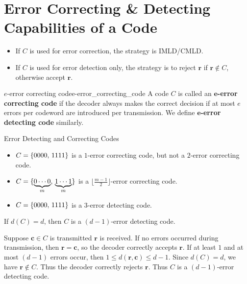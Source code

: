 
\section{Error Correcting \& Detecting Capabilities of a Code}
\begin{itemize}
    \item If $ C $ is used for error correction, the strategy is IMLD/CMLD\@.
    \item If $ C $ is used for error detection only, the strategy is
          to reject $ \symbf{r} $ if $ \symbf{r}\notin C $, otherwise accept $ \symbf{r} $.
\end{itemize}

\begin{Definition}{$ e $-error correcting code}{e-error_correcting_code}
    A code $ C $ is called an \textbf{$\symbf{e}$-error correcting code}
    if the decoder always makes the correct decision if
    at most $ e $ errors per codeword are introduced per transmission.
    We define \textbf{$\symbf{e}$-error detecting code} similarly.
\end{Definition}

\begin{Example}{Error Detecting and Correcting Codes}{}
    \begin{itemize}
        \item $ C=\{0000,\,1111\} $ is a $ 1 $-error correcting code, but not a
              $ 2 $-error correcting code.
        \item $ C=\{\underbrace{0\cdots 0}_{m},\,\underbrace{1\cdots 1}_{m}\} $
              is a $ \bigl\lfloor \frac{m-1}{2} \bigr\rfloor $-error correcting code.
        \item $ C=\{0000,\,1111\} $ is a $ 3 $-error detecting code.
    \end{itemize}
\end{Example}

\begin{Theorem}{}{}
    If $ d(C)=d $, then $ C $ is a $ (d-1) $-error detecting code.
\end{Theorem}

\begin{Proof}{}{}
    Suppose $ \symbf{c}\in C $ is transmitted $ \symbf{r} $ is received. If no
    errors occurred during transmission, then $ \symbf{r}=\symbf{c} $,
    so the decoder correctly accepts $ \symbf{r} $. If at least $ 1 $
    and at most $ (d-1) $ errors occur, then
    $ 1\leqslant d(\symbf{r},\symbf{c})\leqslant d-1 $. Since $ d(C)=d $,
    we have $ \symbf{r}\notin C $. Thus the decoder correctly rejects
    $ \symbf{r} $. Thus $ C $ is a $ (d-1) $-error detecting code.
\end{Proof}

